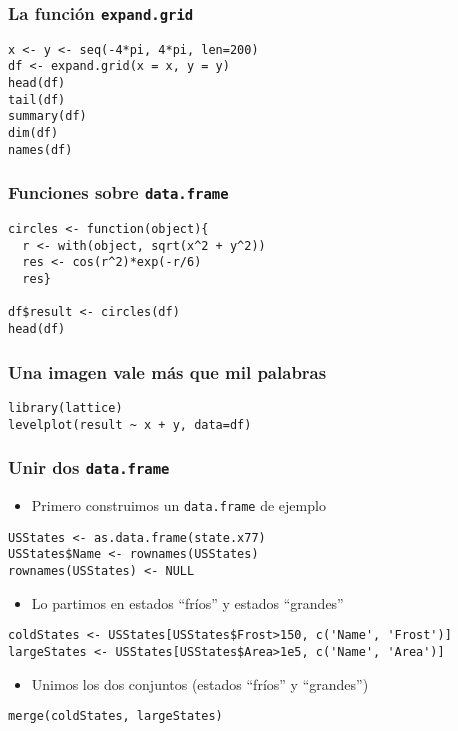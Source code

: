 \documentclass[xcolor={usenames,svgnames,dvipsnames}]{beamer}
\begin{document}
\begin{frame}[fragile]
\frametitle{La función \texttt{expand.grid}}
\label{sec-4-2-4}



\lstset{language=R}
\begin{lstlisting}
x <- y <- seq(-4*pi, 4*pi, len=200)
df <- expand.grid(x = x, y = y)
head(df)
tail(df)
summary(df)
dim(df)
names(df)
\end{lstlisting}
\end{frame}
\begin{frame}[fragile]
\frametitle{Funciones sobre \texttt{data.frame}}
\label{sec-4-2-5}



\lstset{language=R}
\begin{lstlisting}
circles <- function(object){
  r <- with(object, sqrt(x^2 + y^2))
  res <- cos(r^2)*exp(-r/6)
  res}

df$result <- circles(df)
head(df)
\end{lstlisting}
\end{frame}
\begin{frame}[fragile]
\frametitle{Una imagen vale más que mil palabras}
\label{sec-4-2-6}


\lstset{language=R}
\begin{lstlisting}
library(lattice)
levelplot(result ~ x + y, data=df)
\end{lstlisting}
\end{frame}
\begin{frame}[fragile]
\frametitle{Unir dos \texttt{data.frame}}
\label{sec-4-2-7}

\begin{itemize}
\item Primero construimos un \texttt{data.frame} de ejemplo
\end{itemize}

\lstset{language=R}
\begin{lstlisting}
USStates <- as.data.frame(state.x77)
USStates$Name <- rownames(USStates)
rownames(USStates) <- NULL
\end{lstlisting}
\begin{itemize}
\item Lo partimos en estados ``fríos'' y estados ``grandes''
\end{itemize}

\lstset{language=R}
\begin{lstlisting}
coldStates <- USStates[USStates$Frost>150, c('Name', 'Frost')]
largeStates <- USStates[USStates$Area>1e5, c('Name', 'Area')]
\end{lstlisting}
\begin{itemize}
\item Unimos los dos conjuntos (estados ``fríos'' y ``grandes'')
\end{itemize}

\lstset{language=R}
\begin{lstlisting}
merge(coldStates, largeStates)
\end{lstlisting}
\end{frame}
\end{document}

